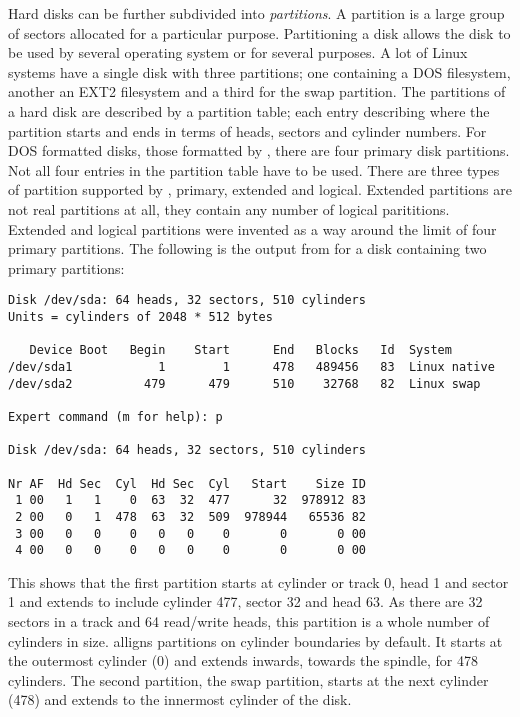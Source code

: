 Hard disks can be further subdivided into {\em partitions}.
A partition is a large group of sectors allocated for a particular purpose.
Partitioning a disk allows the disk to be used by several operating system or for several purposes.
A lot of Linux systems have a single disk with three partitions; one containing a DOS filesystem, 
another an EXT2 filesystem and a third for the swap partition.
The partitions of a hard disk are described by a partition table; each entry describing where the partition
starts and ends in terms of heads, sectors and cylinder numbers.
For DOS formatted disks, those formatted by , there are four primary disk partitions.
Not all four entries in the partition table have to be used.
There are three types of partition supported by , primary, extended and logical.
Extended partitions are not real partitions at all, they contain any number of logical parititions.
Extended and logical partitions were invented as a way around the limit of four primary partitions.
The following is the output from  for a disk containing two primary partitions:
\begin{verbatim}
Disk /dev/sda: 64 heads, 32 sectors, 510 cylinders
Units = cylinders of 2048 * 512 bytes

   Device Boot   Begin    Start      End   Blocks   Id  System
/dev/sda1            1        1      478   489456   83  Linux native
/dev/sda2          479      479      510    32768   82  Linux swap

Expert command (m for help): p

Disk /dev/sda: 64 heads, 32 sectors, 510 cylinders

Nr AF  Hd Sec  Cyl  Hd Sec  Cyl   Start    Size ID
 1 00   1   1    0  63  32  477      32  978912 83
 2 00   0   1  478  63  32  509  978944   65536 82
 3 00   0   0    0   0   0    0       0       0 00
 4 00   0   0    0   0   0    0       0       0 00
\end{verbatim}
This shows that the first partition starts at cylinder or track 0, head 1 and sector 1 and extends to
include cylinder 477, sector 32 and head 63.
As there are 32 sectors in a track and 64 read/write heads, this partition is a whole number of 
cylinders in size.
 alligns partitions on cylinder boundaries by default.
It starts at the outermost cylinder (0) and extends inwards, towards the spindle, for 478 cylinders.
The second partition, the swap partition, starts at the next cylinder (478) and extends to the 
innermost cylinder of the disk.

